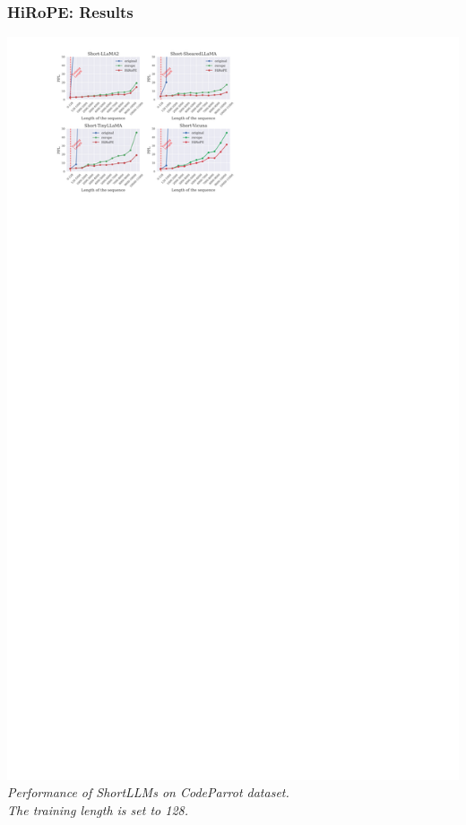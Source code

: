 \documentclass[notheorems,10pt]{beamer}
\begin{document}
\begin{frame}
    \frametitle{HiRoPE: Results}

    \begin{center}
        \includegraphics[height=0.75\textheight]{attachments/results.pdf}
        \\[1ex]
        \textit{Performance of ShortLLMs on CodeParrot dataset.\\ The training length is set to 128.}
    \end{center}
\end{frame}
\end{document}
